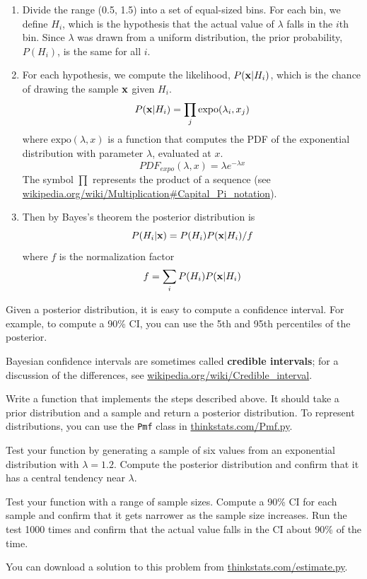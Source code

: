 \documentclass[12pt]{book}
\begin{document}
\begin{enumerate}

\item Divide the range (0.5, 1.5) into a set of equal-sized bins.
For each bin, we define $H_i$, which is the hypothesis that the
actual value of $\lambda$ falls in the $i$th bin.
Since $\lambda$ was drawn from a uniform distribution, the prior
probability, $P(H_i)$, is the same for all $i$.

\item For each hypothesis, we compute the likelihood, $P(\mathbf{x}|H_i)$,
which is the chance of drawing the sample $\mathbf{x}$ given $H_i$.
%
\[ P(\mathbf{x}|H_i) = \prod_j \mathrm{expo}(\lambda_i, x_j)  \]
%
where $\mathrm{expo}(\lambda, x)$ is a function that
computes the PDF of the exponential distribution with parameter $\lambda$,
evaluated at $x$.  
%
\[ PDF_{expo}(\lambda, x) = \lambda e^{-\lambda x}\]
%
The symbol $\prod$ represents the product of a sequence (see
\url{wikipedia.org/wiki/Multiplication#Capital_Pi_notation}).

\item Then by Bayes's theorem the posterior distribution is
%
\[ P(H_i|\mathbf{x}) =  P(H_i) P(\mathbf{x}|H_i) / f \]
%
where $f$ is the normalization factor
%
\[ f = \sum_i P(H_i) P(\mathbf{x}|H_i) \]
%
\end{enumerate}

Given a posterior distribution, it is easy to compute a confidence
interval.  For example, to compute a 90\% CI, you can
use the 5th and 95th percentiles of the posterior.


Bayesian confidence intervals are sometimes called {\bf credible
intervals}; for a discussion of the differences, see
\url{wikipedia.org/wiki/Credible_interval}.




\begin{ex}

Write a function that implements the steps described above.  It should
take a prior distribution and a sample and return a posterior distribution.
To represent distributions, you can use
the {\tt Pmf} class in \url{thinkstats.com/Pmf.py}.


Test your function by generating a sample of six values from an
exponential distribution with $\lambda = 1.2$.  Compute the posterior
distribution and confirm that it has a central tendency near $\lambda$.

Test your function with a range of sample sizes.  Compute a 90\% CI
for each sample and confirm that it gets narrower as
the sample size increases.  Run the test 1000 times and confirm that
the actual value falls in the CI about 90\% of the time.

You can download a solution to this problem from
\url{thinkstats.com/estimate.py}.

\end{ex}
\end{document}
